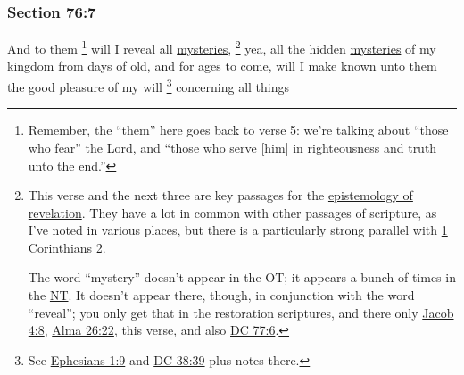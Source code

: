 	\subsubsection{Section 76:7} %
		\label{DC76-7}

		And to them%
			\footnote{%
				\label{DC76-7-them}%
				Remember, the ``them'' here goes back to verse 5: we're talking about ``those who fear'' the Lord, and ``those who serve [him] in righteousness and truth unto the end.''
				}
		will I reveal all \hyperref[MYSTERY]{mysteries},%
			\footnote{%
				\label{DC76-7-mysteries}%
				This verse and the next three are key passages for the \hyperref[EPIST-REVELATION]{epistemology of revelation}. They have a lot in common with other passages of scripture, as I've noted in various places, but there is a particularly strong parallel with \hyperref[1CORINTHIANS-2]{1 Corinthians 2}.
				
				The word ``mystery'' doesn't appear in the OT; it appears a bunch of times in the \hyperref[MYSTERY-NT]{NT}. It doesn't appear there, though, in conjunction with the word ``reveal''; you only get that in the restoration scriptures, and there only \hyperref[JACOB-4-8]{Jacob 4:8}, \hyperref[ALMA-26-22]{Alma 26:22}, this verse, and also \hyperref[DC77-6]{DC 77:6}.
				}
		yea, all the hidden \hyperref[MYSTERY]{mysteries} of my kingdom from days of old, and for ages to come, will I make known unto them the good pleasure of my will%
			\footnote{%
				See \hyperref[EPHESIANS-1-9]{Ephesians 1:9} and \hyperref[DC38-39]{DC 38:39} plus notes there.
				}
		concerning all things%
